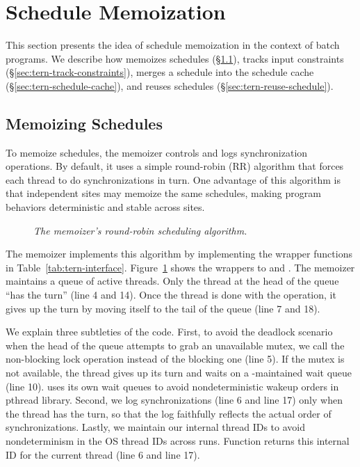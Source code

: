 \section{Schedule Memoization}  \label{sec:tern-batch}

This section presents the idea of schedule memoization in the context of
batch programs.  We describe how \tern memoizes schedules
(\S\ref{sec:tern-derive-schedule}), tracks input constraints
(\S\ref{sec:tern-track-constraints}), merges a schedule into the schedule cache
(\S\ref{sec:tern-schedule-cache}), and reuses schedules
(\S\ref{sec:tern-reuse-schedule}).

\subsection{Memoizing Schedules}  \label{sec:tern-derive-schedule}

To memoize schedules, the memoizer controls and logs synchronization
operations. By default, it uses a simple round-robin (RR) algorithm that
forces each thread to do synchronizations in turn.  One advantage of this
algorithm is that independent sites may memoize the same schedules, making
program behaviors deterministic and stable across sites.

\begin{figure}[t]
\tiny {}
\caption{\small \emph{The memoizer's round-robin scheduling algorithm.}}
\label{fig:tern-memoizer}
\end{figure}

The memoizer implements this algorithm by implementing the wrapper
functions in Table~\ref{tab:tern-interface}.  Figure~\ref{fig:tern-memoizer} shows
the wrappers to  and
.  The memoizer maintains a queue of active
threads.  Only the thread at the head of the queue ``has the turn'' (line
4 and 14).  Once the thread is done with the operation, it gives up the
turn by moving itself to the tail of the queue (line 7 and 18).

We explain three subtleties of the code.  First, to avoid the deadlock
scenario when the head of the queue attempts to grab an unavailable mutex,
we call the non-blocking lock operation instead of the blocking one (line
5).  If the mutex is not available, the thread gives up its turn and waits
on a \tern-maintained wait queue (line 10).  \tern uses its own wait queues
to avoid nondeterministic wakeup orders in pthread library.  Second, we
log synchronizations (line 6 and line 17) only when the thread has the turn, so
that the log faithfully reflects the actual order of synchronizations.
Lastly, we maintain our internal thread IDs to avoid nondeterminism in the
OS thread IDs across runs.  Function  returns this internal ID
for the current thread (line 6 and line 17).

